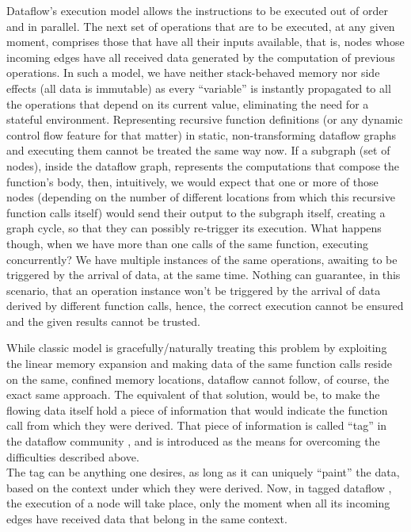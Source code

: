 \documentclass[ack,preface]{dithesis}
\begin{document}
Dataflow's execution model allows the instructions to be executed out of order and in parallel. The next set of operations that are to be executed, at any given moment, comprises those that have all their inputs available, that is, nodes whose incoming edges have all received data generated by the computation of previous operations. In such a model, we have neither stack-behaved memory nor side effects (all data is immutable) as every “variable” is instantly propagated to all the operations that depend on its current value, eliminating the need for a stateful environment.  Representing recursive function definitions (or any dynamic control flow feature for that matter) in static, non-transforming dataflow graphs and executing them cannot be treated the same way now.
If a subgraph (set of nodes), inside the dataflow graph, represents the computations that compose the function’s body, then, intuitively, we would expect that one or more of those nodes (depending on the number of different locations from which this recursive function calls itself) would send their output to the subgraph itself, creating a graph cycle, so that they can possibly re-trigger its execution. What happens though, when we have more than one calls of the same function, executing concurrently?  We have multiple instances of the same operations, awaiting to be triggered by the arrival of data, at the same time. Nothing can guarantee, in this scenario, that an operation instance won’t be triggered by the arrival of data derived by different function calls, hence, the correct execution cannot be ensured and the given results cannot be trusted.

While classic model is gracefully/naturally treating this problem by exploiting the linear memory expansion and making data of the same function calls reside on the same, confined memory locations, dataflow cannot follow, of course, the exact same approach. The equivalent of that solution, would be, to make the flowing data itself hold a piece of information that would indicate the function call from which they were derived. That piece of information is called “tag” in the dataflow community \cite{Nikhil:2000}, and is introduced as the means for overcoming the difficulties described above.\\
 The tag can be anything one desires, as long as it can uniquely “paint” the data, based on the context under which they were derived. 
Now,  in tagged dataflow , the execution of a node will take place, only the moment when all its incoming edges have received data that belong in the same context.
    
\end{document}

